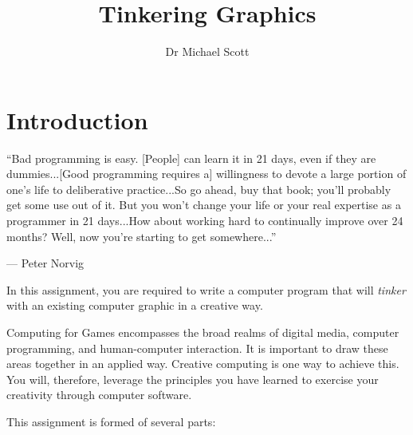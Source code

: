\documentclass{../fal_assignment}
\title{Tinkering Graphics}
\author{Dr Michael Scott}
\begin{document}
\maketitle

\section*{Introduction}

\begin{marginquote}
``Bad programming is easy. [People] can learn it in 21 days, even if they are dummies...[Good programming requires a] willingness to devote a large portion of one's life to deliberative practice...So go ahead, buy that book; you'll probably get some use out of it. But you won't change your life or your real expertise as a programmer in 21 days...How about working hard to continually improve over 24 months? Well, now you're starting to get somewhere...''
\par --- Peter Norvig
\end{marginquote}

In this assignment, you are required to write a computer program that will \textit{tinker} with an existing computer graphic in a creative way.

Computing for Games encompasses the broad realms of digital media, computer programming, and human-computer interaction. It is important to draw these areas together in an applied way. Creative computing is one way to achieve this. You will, therefore, leverage the principles you have learned to exercise your creativity through computer software. 

This assignment is formed of several parts:
\end{document}
